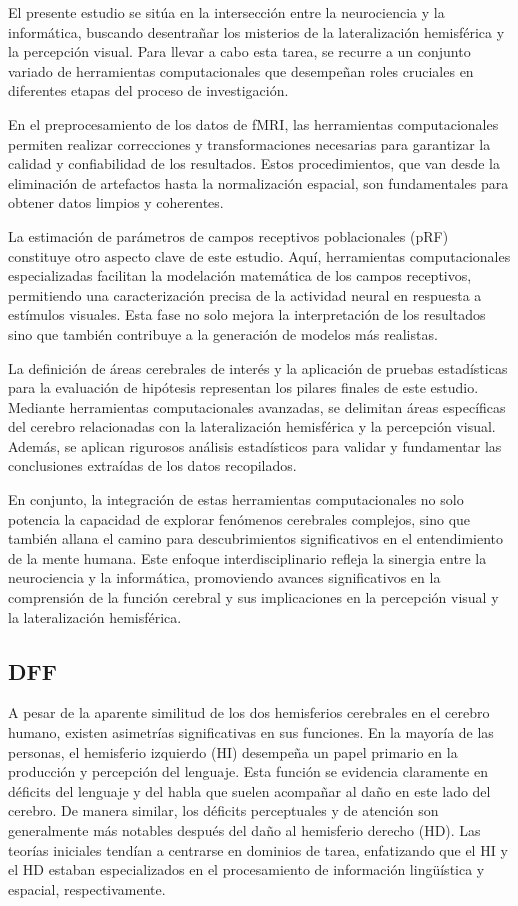 \documentclass[12pt,oneside]{uhthesis}
\begin{document}
El presente estudio se sitúa en la intersección entre la neurociencia y la informática, buscando desentrañar los misterios de la lateralización hemisférica y la percepción visual. Para llevar a cabo esta tarea, se recurre a un conjunto variado de herramientas computacionales que desempeñan roles cruciales en diferentes etapas del proceso de investigación.

En el preprocesamiento de los datos de fMRI, las herramientas computacionales permiten realizar correcciones y transformaciones necesarias para garantizar la calidad y confiabilidad de los resultados. Estos procedimientos, que van desde la eliminación de artefactos hasta la normalización espacial, son fundamentales para obtener datos limpios y coherentes.

La estimación de parámetros de campos receptivos poblacionales (pRF) constituye otro aspecto clave de este estudio. Aquí, herramientas computacionales especializadas facilitan la modelación matemática de los campos receptivos, permitiendo una caracterización precisa de la actividad neural en respuesta a estímulos visuales. Esta fase no solo mejora la interpretación de los resultados sino que también contribuye a la generación de modelos más realistas.

La definición de áreas cerebrales de interés y la aplicación de pruebas estadísticas para la evaluación de hipótesis representan los pilares finales de este estudio. Mediante herramientas computacionales avanzadas, se delimitan áreas específicas del cerebro relacionadas con la lateralización hemisférica y la percepción visual. Además, se aplican rigurosos análisis estadísticos para validar y fundamentar las conclusiones extraídas de los datos recopilados.

En conjunto, la integración de estas herramientas computacionales no solo potencia la capacidad de explorar fenómenos cerebrales complejos, sino que también allana el camino para descubrimientos significativos en el entendimiento de la mente humana. Este enfoque interdisciplinario refleja la sinergia entre la neurociencia y la informática, promoviendo avances significativos en la comprensión de la función cerebral y sus implicaciones en la percepción visual y la lateralización hemisférica.

\subsection{DFF}

A pesar de la aparente similitud de los dos hemisferios cerebrales en el cerebro humano, existen asimetrías significativas en sus funciones. En la mayoría de las personas, el hemisferio izquierdo (HI) desempeña un papel primario en la producción y percepción del lenguaje. Esta función se evidencia claramente en déficits del lenguaje y del habla que suelen acompañar al daño en este lado del cerebro. De manera similar, los déficits perceptuales y de atención son generalmente más notables después del daño al hemisferio derecho (HD). Las teorías iniciales tendían a centrarse en dominios de tarea, enfatizando que el HI y el HD estaban especializados en el procesamiento de información lingüística y espacial, respectivamente.
\end{document}
